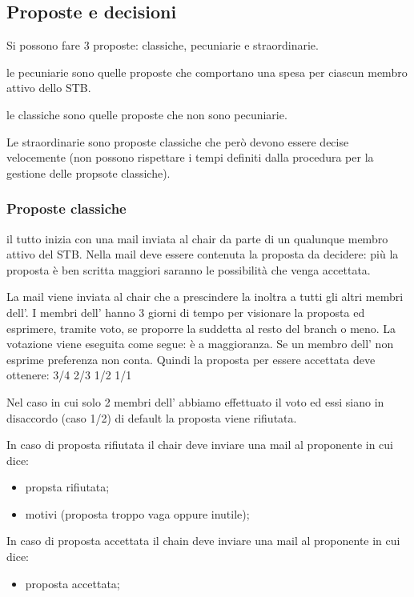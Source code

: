 \documentclass[pdf]{article}
\theoremstyle{definition}
\begin{document}
\subsection{Proposte e decisioni}

Si possono fare 3 proposte: classiche, pecuniarie e straordinarie.

le pecuniarie sono quelle proposte che comportano una spesa per ciascun membro attivo dello STB.

le classiche sono quelle proposte che non sono pecuniarie.

Le straordinarie sono proposte classiche che però devono essere decise velocemente (non possono rispettare i tempi definiti dalla procedura per la gestione delle propsote classiche).

\subsubsection{Proposte classiche}

il tutto inizia con una mail inviata al chair da parte di un qualunque membro attivo del STB. Nella mail deve essere contenuta la proposta da decidere: più la proposta è ben scritta maggiori saranno le possibilità che venga accettata. 

La mail viene inviata al chair che a prescindere la inoltra a tutti gli altri membri dell'\EC{}. I membri dell'\EC{} hanno 3 giorni di tempo per visionare la proposta ed esprimere, tramite voto, se proporre la suddetta al resto del branch o meno.
La votazione viene eseguita come segue:
è a maggioranza. Se un membro dell'\EC{} non esprime preferenza non conta. Quindi la proposta per essere accettata deve ottenere:
3/4
2/3
1/2
1/1

Nel caso in cui solo 2 membri dell'\EC{} abbiamo effettuato il voto ed essi siano in disaccordo (caso 1/2) di default la proposta viene rifiutata.

In caso di proposta rifiutata il chair deve inviare una mail al proponente in cui dice:
\begin{itemize}
	\item propsta rifiutata;
	\item motivi (proposta troppo vaga oppure inutile);
\end{itemize}

In caso di proposta accettata il chain deve inviare una mail al proponente in cui dice:
\begin{itemize}
	\item proposta accettata;
\end{itemize}
\end{document}

